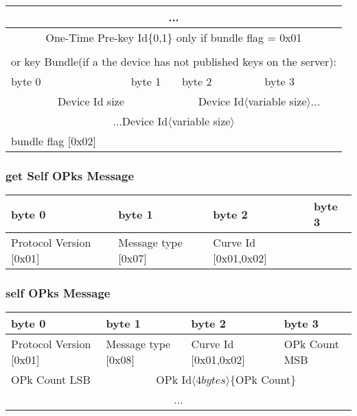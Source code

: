 \documentclass[a4paper,11pt]{article}
\begin{document}
\begin{center}
\begin{tabular}{ | p{1.4in} | p{1.4in} | p{1.4in} | p{1.4in} |}
        \multicolumn{4}{|c|}{...}\\
        \hline
        \multicolumn{4}{|c|}{One-Time Pre-key Id\{0,1\} only if bundle flag = 0x01}\\
        \hline
        \multicolumn{4}{c}{}\\
        \multicolumn{4}{c}{or key Bundle(if a the device has not published keys on the server):}\\
        \hline
        \cellcolor[gray]{0.95} byte 0 & \cellcolor[gray]{0.95} byte 1 & \cellcolor[gray]{0.95} byte 2 & \cellcolor[gray]{0.95}byte 3\\
        \hline
        \multicolumn{2}{|c|}{Device Id size}&\multicolumn{2}{c|}{Device Id$\langle$variable size$\rangle$...}\\
        \hline
        \multicolumn{4}{|c|}{...Device Id$\langle$variable size$\rangle$}\\
        \hline
        bundle flag [0x02]\\
        \cline{1-1}
      \end{tabular}
      \end{center}
      
    \subsubsection{get Self OPks Message}
      \begin{center}
      \begin{tabular}{ | p{1.4in} | p{1.4in} | p{1.4in} | p{1.4in} |}
        \hline
        \cellcolor[gray]{0.85} byte 0 & \cellcolor[gray]{0.85} byte 1 & \cellcolor[gray]{0.85} byte 2 & \cellcolor[gray]{0.85}byte 3\\
        \hline
        Protocol Version [0x01] & Message type [0x07] & Curve Id [0x01,0x02] & \\
        \hline
      \end{tabular}
      \end{center}

    \subsubsection{self OPks Message}
      \begin{center}
      \begin{tabular}{ | p{1.4in} | p{1.4in} | p{1.4in} | p{1.4in} |}
        \hline
        \cellcolor[gray]{0.85} byte 0 & \cellcolor[gray]{0.85} byte 1 & \cellcolor[gray]{0.85} byte 2 & \cellcolor[gray]{0.85}byte 3\\
        \hline
        Protocol Version [0x01] & Message type [0x08] & Curve Id [0x01,0x02] & OPk Count MSB\\
        \hline
        OPk Count LSB & \multicolumn{3}{c|}{OPk Id$\langle 4bytes\rangle $\{OPk Count\}}\\
        \cline{1-1}
        \multicolumn{4}{|c|}{...}\\
        \hline
      \end{tabular}
      \end{center}
\end{document}
